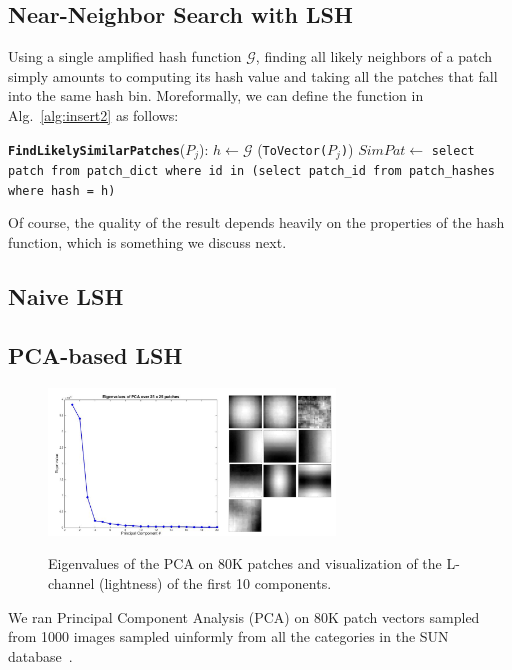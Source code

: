 \subsection{Near-Neighbor Search with LSH}\label{ssec:nn-lsh}

Using a single amplified hash function $\mathcal{G}$, finding
all likely neighbors of a patch simply amounts to computing
its hash value and taking all the patches that fall into the
same hash bin.
Moreformally, we can define the function
in Alg.~\ref{alg:insert2} as follows:
\begin{algorithmic}[1]
\Statex \texttt{\textbf{FindLikelySimilarPatches}}($P_j$):
\State $h \leftarrow \mathcal{G}$ (\texttt{ToVector($P_j$)})
\State $SimPat \leftarrow$ \texttt{select patch from patch\_dict where id in
(select patch\_id from patch\_hashes where hash = h)}
\end{algorithmic}
Of course, the quality of the result depends heavily on the
properties of the hash function, which is something we discuss next.

\subsection{Naive LSH}\label{sec:naive-nn}

\subsection{PCA-based LSH}

\begin{figure}[ht!]
\includegraphics[width=3.0in]{fig_NN/principal_comps.png}
\label{fig:lambdas}
\caption{Eigenvalues of the PCA on 80K patches and visualization
of the L-channel (lightness) of the first 10 components.}
\end{figure}


We ran Principal Component Analysis (PCA) on 80K patch vectors
sampled from 1000 images
sampled uinformly from all the categories in the
SUN database~\cite{SUN}.



